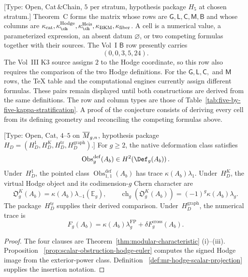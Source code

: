 \begin{conjecture}
\label{cor:mr-C}
\textup{[Type: Open, Cat$\,\&$Chain, $5$ per stratum, hypothesis
package $H_5$ at chosen stratum.]}
Theorem~C forms the matrix whose rows are
$\mathsf G,\mathsf L,\mathsf C,\mathsf M,\mathsf B$ and whose columns
are
$\kappa_{\mathrm{cat}},\kappa_{\ch}^{\mathrm{Hodge}},
\kappa_{\ch}^{\mathrm{Heis}},\kappa_{\mathrm{BKM}},
\kappa_{\mathrm{fiber}}$.  A cell is a numerical value, a
parameterized expression, an absent datum $\varnothing$, or two
competing formulas together with their sources.  The Vol~I
$\mathsf B$ row presently carries
\[
 (0,0,3,5,24).
\]
The Vol~III K3 source assigns $2$ to the Hodge coordinate, so this row
also requires the comparison of the two Hodge definitions.
For the $\mathsf G,\mathsf L,\mathsf C,$ and $\mathsf M$ rows, the TeX
table and the computational engines currently assign different
formulas.  These pairs remain displayed until both constructions are
derived from the same definitions.
The row and column types are those of
Table~\ref{tab:five-by-five-kappa-stratification}.  A proof of the
conjecture consists of deriving every cell from its defining geometry
and reconciling the competing formulas above.
\end{conjecture}

\begin{corollary}
\label{cor:mr-D}
\textup{[Type: Open, Cat, $4\text{--}5$ on $\overline{M}_{g,n}$, hypothesis
package $H_D=(H_D^1,H_D^K,H_D^{\mathrm{tr}},
H_D^{\mathrm{graph}})$.]}
For $g\geq2$, the native deformation class satisfies
\[
 \operatorname{Obs}^{\mathrm{def}}_g(A_b)
 \in H^2\!\left(\Def_g(A_b)\right).
\]
Under~$H_D^1$, the pointed class
$\operatorname{Obs}^{\mathrm{def}}_{1,1}(A_b)$ has trace
$\kappa(A_b)\lambda_1$.  Under~$H_D^K$, the virtual Hodge object and
its codimension-$g$ Chern character are
\[
 \mathfrak O^K_g(A_b)=\kappa(A_b)\lambda_{-1}(\mathbb E_g),
 \qquad
 \operatorname{ch}_g\!\left(\mathfrak O^K_g(A_b)\right)
 =(-1)^g\kappa(A_b)\lambda_g.
\]
The package~$H_D^{\mathrm{tr}}$ supplies their derived comparison.
Under~$H_D^{\mathrm{graph}}$, the numerical trace is
\[
 F_g(A_b)=\kappa(A_b)\lambda_g^{\mathrm{FP}}
 +\delta F_g^{\mathrm{cross}}(A_b).
\]
\end{corollary}

\begin{proof}
The four clauses are Theorem~\ref{thm:modular-characteristic}
\textup{(i)--(iii)}.  Proposition~
\ref{prop:scalar-obstruction-hodge-euler} computes the signed Hodge
image from the exterior-power class.  Definition~
\ref{def:mr-hodge-scalar-projection} supplies the insertion notation.
\end{proof}

